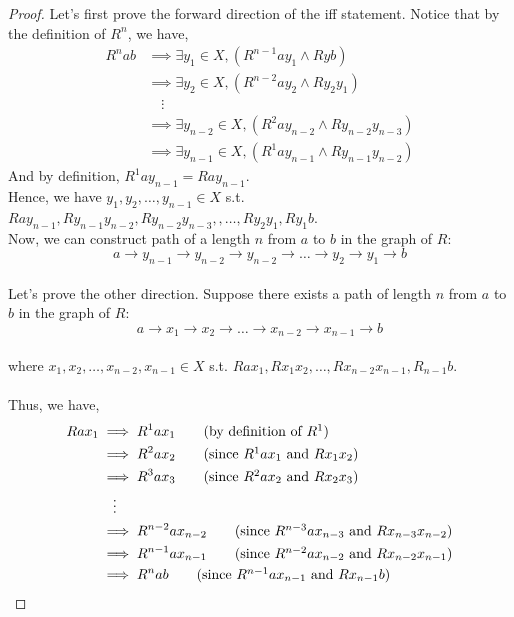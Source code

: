 \documentclass[12pt]{article}
\begin{document}
\begin{proof}
    Let's first prove the forward direction of the iff statement. 
    Notice that by the definition of $R^n$, we have,
    \begin{align*}
        R^{n}ab &\implies \exists y_1 \in X, (R^{n-1}ay_1 \land Ryb)\\
            &\implies \exists y_2 \in X, (R^{n-2}ay_2 \land Ry_2y_1)\\
            &\quad \vdots\\
            &\implies \exists y_{n-2} \in X, (R^{2}ay_{n-2} \land Ry_{n-2}y_{n-3})\\
            &\implies \exists y_{n-1} \in X, (R^{1}ay_{n-1} \land Ry_{n-1}y_{n-2})
    \end{align*}
    And by definition, $R^{1}ay_{n-1} = Ray_{n-1}$.\\
    Hence, we have $y_1, y_2, \dots, y_{n-1} \in X$ s.t. $Ray_{n-1}, Ry_{n-1}y_{n-2}, Ry_{n-2}y_{n-3},, \dots ,Ry_2y_1, Ry_1b$.\\
    Now, we can construct path of a length $n$ from $a$ to $b$ in the graph of $R$: 
    $$a \to y_{n-1} \to y_{n-2} \to y_{n-2} \to \dots \to y_2 \to y_1 \to b$$
    \\
    Let's prove the other direction. Suppose there exists a path of length $n$ from $a$ to $b$ in the graph of $R$:
    $$a \to x_1 \to x_2 \to \dots \to x_{n-2} \to x_{n-1} \to b$$
    \\
    where $x_1, x_2, \dots, x_{n-2}, x_{n-1} \in X$ s.t. $Rax_1, Rx_1x_2, \dots, Rx_{n-2}x_{n-1}, R_{n-1}b$.\\
    \\
    Thus, we have,
    \begin{align*}
        Rax_1 &\implies R^1ax_1 \tag{by definition of $R^1$}\\
              &\implies R^2ax_2 \tag{since $R^1ax_1$ and $Rx_1x_2$}\\
              &\implies R^3ax_3 \tag{since $R^2ax_2$ and $Rx_2x_3$}\\
              &\quad \vdots\\
              &\implies R^{n-2}ax_{n-2} \tag{since $R^{n-3}ax_{n-3}$ and $Rx_{n-3}x_{n-2}$}\\
              &\implies R^{n-1}ax_{n-1} \tag{since $R^{n-2}ax_{n-2}$ and $Rx_{n-2}x_{n-1}$}\\
              &\implies R^{n}ab \tag{since $R^{n-1}ax_{n-1}$ and $Rx_{n-1}b$}
    \end{align*}
\end{proof}
\end{document}

